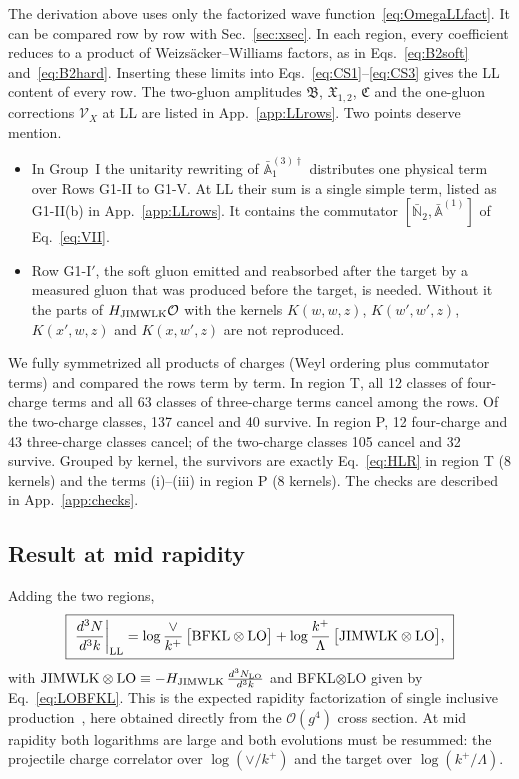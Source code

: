 \documentclass[aps,prd,onecolumn,superscriptaddress,nofootinbib,floatfix,longbibliography,11pt]{revtex4-2}
\numberwithin{equation}{section}
\def\mf#1{\mathbb{#1}}
\newcommand{\Ord}{\mathcal{O}}
\begin{document}
The derivation above uses only the factorized wave function~\eqref{eq:OmegaLLfact}. It can be compared row by row with Sec.~\ref{sec:xsec}. In each region, every coefficient reduces to a product of Weizs\"acker--Williams factors, as in Eqs.~\eqref{eq:B2soft} and~\eqref{eq:B2hard}. Inserting these limits into Eqs.~\eqref{eq:CS1}--\eqref{eq:CS3} gives the LL content of every row. The two-gluon amplitudes $\mathfrak B$, $\mathfrak X_{1,2}$, $\mathfrak C$ and the one-gluon corrections $\mathcal V_X$ at LL are listed in App.~\ref{app:LLrows}. Two points deserve mention.
\begin{itemize}
\item In Group~I the unitarity rewriting of $\bar{\mf A}^{(3)\dagger}_1$ distributes one physical term over Rows G1-II to G1-V. At LL their sum is a single simple term, listed as G1-II(b) in App.~\ref{app:LLrows}. It contains the commutator $[\bar{\mf N}_2,\bar{\mf A}^{(1)}]$ of Eq.~\eqref{eq:VII}.
\item Row G1-I$'$, the soft gluon emitted and reabsorbed after the target by a measured gluon that was produced before the target, is needed. Without it the parts of $H_{\rm JIMWLK}\Ord$ with the kernels $K(w,w,z)$, $K(w',w',z)$, $K(x',w,z)$ and $K(x,w',z)$ are not reproduced.
\end{itemize}
We fully symmetrized all products of charges (Weyl ordering plus commutator terms) and compared the rows term by term. In region T, all 12 classes of four-charge terms and all 63 classes of three-charge terms cancel among the rows. Of the two-charge classes, 137 cancel and 40 survive. In region P, 12 four-charge and 43 three-charge classes cancel; of the two-charge classes 105 cancel and 32 survive. Grouped by kernel, the survivors are exactly Eq.~\eqref{eq:HLR} in region T (8 kernels) and the terms (i)--(iii) in region P (8 kernels). The checks are described in App.~\ref{app:checks}.

\subsection{Result at mid rapidity}\label{sec:LLresult}

Adding the two regions,
\begin{equation}
\boxed{\ \frac{d^3N}{d^3k}\bigg|_{\rm LL}=\log\frac{\vee}{k^+}\,\big[{\rm BFKL}\otimes{\rm LO}\big]+\log\frac{k^+}{\Lambda}\,\big[{\rm JIMWLK}\otimes{\rm LO}\big],\ }
\label{eq:LLmain}
\end{equation}
with ${\rm JIMWLK}\otimes{\rm LO}\equiv-H_{\rm JIMWLK}\,\frac{d^3N_{\rm LO}}{d^3k}$ and BFKL$\otimes$LO given by Eq.~\eqref{eq:LOBFKL}.
This is the expected rapidity factorization of single inclusive production~\cite{Kovchegov:2001sc,Baier:2005dv,Kovner:2006ge,Kovner:2006wr,Gelis:2008rw}, here obtained directly from the $\Ord(g^4)$ cross section. At mid rapidity both logarithms are large and both evolutions must be resummed: the projectile charge correlator over $\log(\vee/k^+)$ and the target over $\log(k^+/\Lambda)$.
\end{document}
